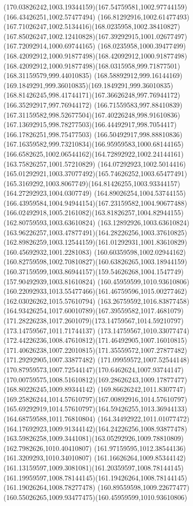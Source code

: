 {{		\curveto(170.03826242,1003.19344159)(167.54759581,1002.97744159)(166.43426251,1002.57477494)
		\curveto(166.81292916,1002.61477493)(167.71026247,1002.5134416)(168.0235958,1002.38410827)
		\curveto(167.85026247,1002.12410828)(167.39292915,1001.02677497)(167.72092914,1000.69744165)
		\curveto(168.0235958,1000.39477499)(168.42092912,1000.91877498)(168.42092912,1000.91877498)
		\curveto(168.42092912,1000.91877498)(168.0315958,999.71877501)(168.31159579,999.44010835)
		\curveto(168.58892912,999.16144169)(169.1849291,999.36010835)(169.1849291,999.36010835)
		\curveto(168.81426245,998.41744171)(167.36626248,997.76944172)(166.35292917,997.76944172)
		\curveto(166.71559583,997.88410839)(167.31159582,998.52677504)(167.40226248,998.91610836)
		\curveto(167.13692915,998.78277503)(166.44492917,998.7054417)(166.17826251,998.75477503)
		\curveto(166.50492917,998.88810836)(167.16359582,999.73210834)(166.95959583,1000.68144165)
		\curveto(166.6582625,1002.06544162)(164.72892922,1002.24144161)(163.75826257,1001.57210829)
		\curveto(164.07292923,1002.5014416)(165.01292921,1003.37077492)(165.74626252,1003.65477491)
		\curveto(165.3169292,1003.8067749)(164.81426255,1003.93344157)(164.27292923,1004.0307749)
		\curveto(164.89026254,1004.53744155)(166.43959584,1004.94944154)(167.23159582,1004.90677488)
		\curveto(166.02492918,1005.2161082)(163.81826257,1004.82944155)(162.80759593,1003.63610824)
		\curveto(163.12892926,1003.63610824)(163.96226257,1003.47877491)(164.28226256,1003.37610825)
		\curveto(162.89826259,1003.12544159)(161.01292931,1001.83610829)(160.45692932,1001.2281083)
		\curveto(160.60359598,1002.02944162)(160.82759598,1002.70810827)(160.63826265,1003.18944159)
		\curveto(160.37159599,1003.86944157)(159.54626268,1004.1547749)(157.90492939,1003.81610824)
		\moveto(160.45959599,1010.93610806)
		\curveto(160.22092933,1013.55477466)(161.46759596,1015.00277462)(162.03026262,1015.57610794)
		\curveto(163.26759592,1016.83877458)(164.93426254,1017.60010789)(167.39559582,1017.4681079)
		\curveto(171.28226238,1017.2601079)(173.14759567,1014.59210797)(173.14759567,1011.71744137)
		\curveto(173.14759567,1010.33077474)(172.44226236,1008.47610812)(171.46492905,1007.16010815)
		\curveto(171.40626238,1007.22010815)(171.35559572,1007.27877482)(171.29292905,1007.33877482)
		\curveto(171.09959572,1007.52544148)(170.87959573,1007.72544147)(170.6462624,1007.93744147)
		\curveto(170.00759575,1008.51610812)(169.28626243,1009.17877477)(168.80226245,1009.89344142)
		\curveto(169.86626242,1011.8307747)(169.25826244,1014.57610797)(167.00892916,1014.57610797)
		\curveto(165.69292919,1014.57610797)(164.59426255,1013.36944133)(164.68759588,1011.76810804)
		\curveto(164.34492922,1011.01077472)(164.17692923,1009.91344142)(164.24226256,1008.93877478)
		\curveto(163.59826258,1009.3441081)(163.05292926,1009.78810809)(162.7982626,1010.40410807)
		\lineto(161.97159595,1012.38544136)
		\lineto(161.3209293,1010.34010807)
		\curveto(161.16626264,1009.85344142)(161.13159597,1009.3081081)(161.20359597,1008.78144145)
		\curveto(161.19959597,1008.78144145)(161.19426264,1008.78144145)(161.19026264,1008.78277478)
		\curveto(160.89559598,1009.22677477)(160.55026265,1009.93477475)(160.45959599,1010.93610806)
	}
}